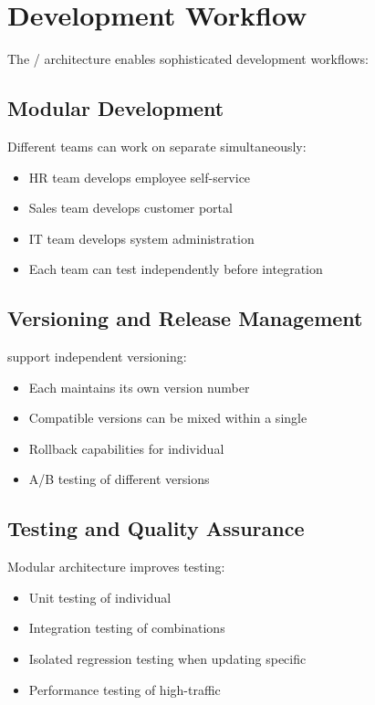 \section{Development Workflow}
\label{sec:development-workflow}

The \webbase{}/\webbaselet{} architecture enables sophisticated development workflows:

\subsection{Modular Development}

Different teams can work on separate  simultaneously:
\begin{itemize}
\item HR team develops employee self-service \webbaselet{}
\item Sales team develops customer portal \webbaselet{}
\item IT team develops system administration \webbaselet{}
\item Each team can test independently before integration
\end{itemize}

\subsection{Versioning and Release Management}

 support independent versioning:
\begin{itemize}
\item Each \webbaselet{} maintains its own version number
\item Compatible versions can be mixed within a single \webbase{}
\item Rollback capabilities for individual 
\item A/B testing of different \webbaselet{} versions
\end{itemize}

\subsection{Testing and Quality Assurance}

Modular architecture improves testing:
\begin{itemize}
\item Unit testing of individual 
\item Integration testing of \webbaselet{} combinations
\item Isolated regression testing when updating specific 
\item Performance testing of high-traffic 
\end{itemize}

